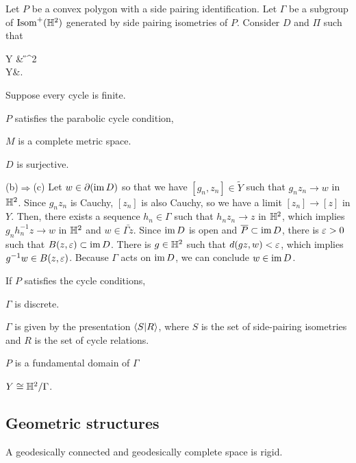 \documentclass[a4paper]{article}
\begin{document}
\begin{prb}
Let $P$ be a convex polygon with a side pairing identification.
Let $\Gamma$ be a subgroup of $\operatorname{Isom}^+(\mathbb{H}^2)$ generated by side pairing isometries of $P$.
Consider $D$ and $\Pi$ such that
\begin{cd}
\tilde Y\dar{\Pi} & \H^2\\
Y&.
\end{cd}
Suppose every cycle is finite.
\begin{parts}
\item $P$ satisfies the parabolic cycle condition,
\item $M$ is a complete metric space.
\item $D$ is surjective.
\end{parts}
\end{prb}
\begin{pf}
(b)$\Rightarrow$(c)
Let $w\in\partial(\operatorname{im} D)$ so that we have $[g_n,z_n]\in\tilde Y$ such that $g_nz_n\to w$ in $\mathbb{H}^2$.
Since $g_nz_n$ is Cauchy, $[z_n]$ is also Cauchy, so we have a limit $[z_n]\to[z]$ in $Y$.
Then, there exists a sequence $h_n\in\Gamma$ such that $h_nz_n\to z$ in $\mathbb{H}^2$, which implies $g_nh_n^{-1}z\to w$ in $\mathbb{H}^2$ and $w\in\bar{\Gamma z}$.
Since $\operatorname{im} D$ is open and $\overline P\subset\operatorname{im} D$, there is $\varepsilon>0$ such that $B(z,\varepsilon)\subset\operatorname{im} D$.
There is $g\in\mathbb{H}^2$ such that $d(gz,w)<\varepsilon$, which implies $g^{-1}w\in B(z,\varepsilon)$.
Because $\Gamma$ acts on $\operatorname{im} D$, we can conclude $w\in\operatorname{im} D$.
\end{pf}

If $P$ satisfies the cycle conditions,
\begin{parts}
\item $\Gamma$ is discrete.
\item $\Gamma$ is given by the presentation $\langle S|R\rangle$, where $S$ is the set of side-pairing isometries and $R$ is the set of cycle relations.
\item $P$ is a fundamental domain of $\Gamma$
\item $Y\cong\mathbb{H}^2/\Gamma$.
\end{parts}



\subsection{Geometric structures}





A geodesically connected and geodesically complete space is rigid.
\end{document}
